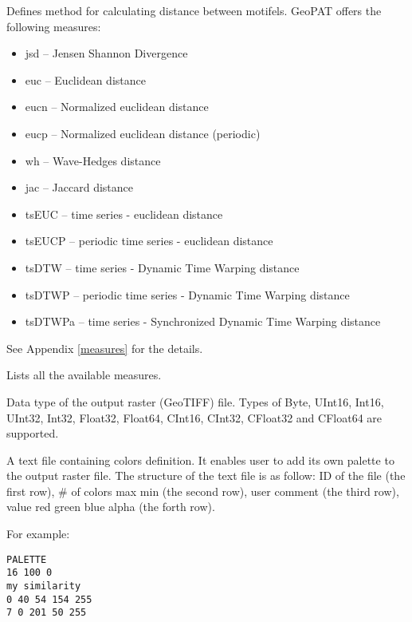 
Defines method for calculating distance between motifels. 
GeoPAT offers the following measures: 
\begin{itemize}
	\item jsd -- Jensen Shannon Divergence
	\item euc -- Euclidean distance
	\item eucn -- Normalized euclidean distance
	\item eucp -- Normalized euclidean distance (periodic)
	\item wh -- Wave-Hedges distance
	\item jac -- Jaccard distance
	\item tsEUC -- time series - euclidean distance
	\item tsEUCP -- periodic time series - euclidean distance
	\item tsDTW -- time series - Dynamic Time Warping distance
	\item tsDTWP -- periodic time series - Dynamic Time Warping distance
	\item tsDTWPa -- time series - Synchronized Dynamic Time Warping distance
\end{itemize}
See Appendix \ref{measures} for the details.


Lists all the available measures.


Data type of the output raster (GeoTIFF) file. Types of Byte, UInt16, Int16, UInt32, Int32, Float32, Float64, CInt16, CInt32, CFloat32 and CFloat64 are supported.


A text file containing colors definition. 
It enables user to add its own palette to the output raster file.
The structure of the text file is as follow:
ID of the file (the first row), \# of colors max min (the second row), user comment (the third row), value red green blue alpha (the forth row). 

For example: \\
\begin{minipage}{\linewidth}
\begin{lstlisting}
PALETTE
16 100 0
my similarity
0 40 54 154 255
7 0 201 50 255
\end{lstlisting}
\end{minipage}


